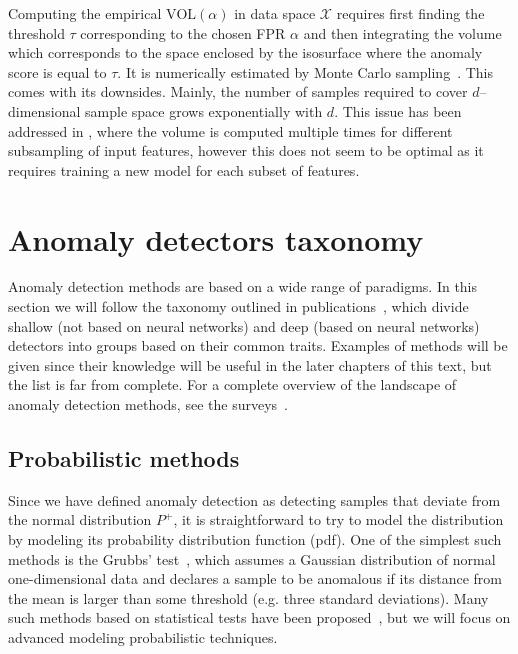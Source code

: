 Computing the empirical $\text{VOL}(\alpha)$ in data space $\mathcal{X}$ requires first finding the threshold $\tau$ corresponding to the chosen FPR $\alpha$ and then integrating the volume which corresponds to the space enclosed by the isosurface where the anomaly score is equal to $\tau$. It is numerically estimated by Monte Carlo sampling~\cite{robert1999monte}. This comes with its downsides. Mainly, the number of samples required to cover $d$--dimensional sample space grows exponentially with $d$. This issue has been addressed in \cite{goix2016evaluate}, where the volume is computed multiple times for different subsampling of input features, however this does not seem to be optimal as it requires training a new model for each subset of features.


\section{Anomaly detectors taxonomy}
Anomaly detection methods are based on a wide range of paradigms. In this section we will follow the taxonomy outlined in publications~\cite{pimentel2014review, ruff2020unifying}, which divide shallow (not based on neural networks) and deep (based on neural networks) detectors into groups based on their common traits. Examples of methods will be given since their knowledge will be useful in the later chapters of this text, but the list is far from complete. For a complete overview of the landscape of anomaly detection methods, see the surveys~\cite{pimentel2014review, campos2016evaluation, goldstein2016comparative, moustafa2019holistic, kwon2019survey, fernandes2019comprehensive, wang2019progress, chalapathy2019deep,ruff2020unifying}.

\subsection{Probabilistic  methods} \label{sec:probabilistic_models}
Since we have defined anomaly detection as detecting samples that deviate from the normal distribution $P^+$, it is straightforward to try to model the distribution by modeling its probability distribution function (pdf). One of the simplest such methods is the Grubbs' test~\cite{grubbs1969procedures}, which assumes a Gaussian distribution of normal one-dimensional data and declares a sample to be anomalous if its distance from the mean is larger than some threshold (e.g. three standard deviations). Many such methods based on statistical tests have been proposed~\cite{barnett1994outliers}, but we will focus on advanced modeling probabilistic techniques.

